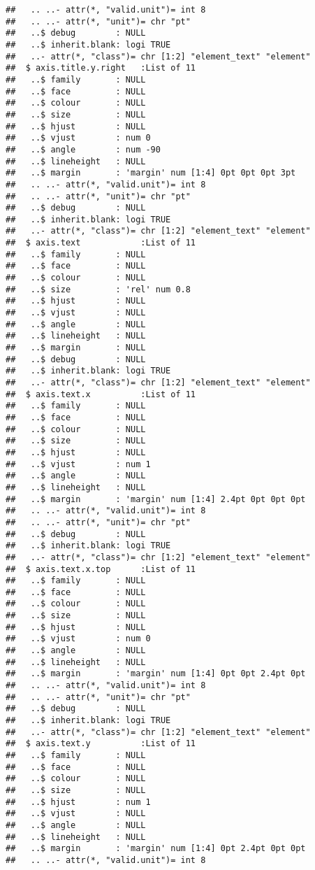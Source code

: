 \documentclass[]{article}
\begin{document}
\begin{verbatim}
##   .. ..- attr(*, "valid.unit")= int 8
##   .. ..- attr(*, "unit")= chr "pt"
##   ..$ debug        : NULL
##   ..$ inherit.blank: logi TRUE
##   ..- attr(*, "class")= chr [1:2] "element_text" "element"
##  $ axis.title.y.right   :List of 11
##   ..$ family       : NULL
##   ..$ face         : NULL
##   ..$ colour       : NULL
##   ..$ size         : NULL
##   ..$ hjust        : NULL
##   ..$ vjust        : num 0
##   ..$ angle        : num -90
##   ..$ lineheight   : NULL
##   ..$ margin       : 'margin' num [1:4] 0pt 0pt 0pt 3pt
##   .. ..- attr(*, "valid.unit")= int 8
##   .. ..- attr(*, "unit")= chr "pt"
##   ..$ debug        : NULL
##   ..$ inherit.blank: logi TRUE
##   ..- attr(*, "class")= chr [1:2] "element_text" "element"
##  $ axis.text            :List of 11
##   ..$ family       : NULL
##   ..$ face         : NULL
##   ..$ colour       : NULL
##   ..$ size         : 'rel' num 0.8
##   ..$ hjust        : NULL
##   ..$ vjust        : NULL
##   ..$ angle        : NULL
##   ..$ lineheight   : NULL
##   ..$ margin       : NULL
##   ..$ debug        : NULL
##   ..$ inherit.blank: logi TRUE
##   ..- attr(*, "class")= chr [1:2] "element_text" "element"
##  $ axis.text.x          :List of 11
##   ..$ family       : NULL
##   ..$ face         : NULL
##   ..$ colour       : NULL
##   ..$ size         : NULL
##   ..$ hjust        : NULL
##   ..$ vjust        : num 1
##   ..$ angle        : NULL
##   ..$ lineheight   : NULL
##   ..$ margin       : 'margin' num [1:4] 2.4pt 0pt 0pt 0pt
##   .. ..- attr(*, "valid.unit")= int 8
##   .. ..- attr(*, "unit")= chr "pt"
##   ..$ debug        : NULL
##   ..$ inherit.blank: logi TRUE
##   ..- attr(*, "class")= chr [1:2] "element_text" "element"
##  $ axis.text.x.top      :List of 11
##   ..$ family       : NULL
##   ..$ face         : NULL
##   ..$ colour       : NULL
##   ..$ size         : NULL
##   ..$ hjust        : NULL
##   ..$ vjust        : num 0
##   ..$ angle        : NULL
##   ..$ lineheight   : NULL
##   ..$ margin       : 'margin' num [1:4] 0pt 0pt 2.4pt 0pt
##   .. ..- attr(*, "valid.unit")= int 8
##   .. ..- attr(*, "unit")= chr "pt"
##   ..$ debug        : NULL
##   ..$ inherit.blank: logi TRUE
##   ..- attr(*, "class")= chr [1:2] "element_text" "element"
##  $ axis.text.y          :List of 11
##   ..$ family       : NULL
##   ..$ face         : NULL
##   ..$ colour       : NULL
##   ..$ size         : NULL
##   ..$ hjust        : num 1
##   ..$ vjust        : NULL
##   ..$ angle        : NULL
##   ..$ lineheight   : NULL
##   ..$ margin       : 'margin' num [1:4] 0pt 2.4pt 0pt 0pt
##   .. ..- attr(*, "valid.unit")= int 8

\end{verbatim}
\end{document}
